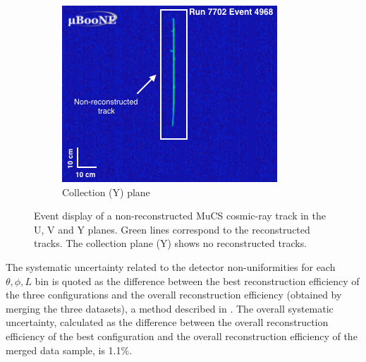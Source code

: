 \documentclass[a4paper,11pt]{article}
\begin{document}
\begin{figure}[htbp]
\begin{center}
    \begin{subfigure}{0.3\textwidth}
      \includegraphics[width=\linewidth]{figures/y.png}
      \caption{Collection (Y) plane} \label{fig:y}
    \end{subfigure}    \caption{Event display of a non-reconstructed MuCS cosmic-ray track in the U, V and Y planes. Green lines correspond to the reconstructed tracks. The collection plane (Y) shows no reconstructed tracks.} \label{fig:example}
  \end{center}
\end{figure}

The systematic uncertainty related to the detector non-uniformities for each $\theta,\phi,L$ bin is quoted as the difference between the best reconstruction efficiency of the three configurations and the overall reconstruction efficiency (obtained by merging the three datasets), a method described in \cite{besiii}. The overall systematic uncertainty, calculated as the difference between the overall reconstruction efficiency of the best configuration and the overall reconstruction efficiency of the merged data sample, is 1.1\%.


\end{document}
